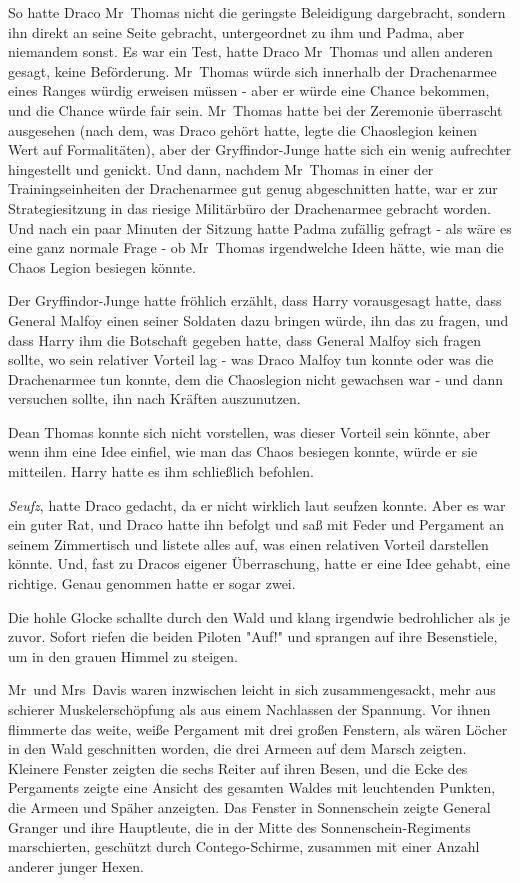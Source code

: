 {So hatte Draco Mr~Thomas nicht die geringste Beleidigung dargebracht, sondern ihn direkt an seine Seite gebracht, untergeordnet zu ihm und Padma, aber niemandem sonst. Es war ein Test, hatte Draco Mr~Thomas und allen anderen gesagt, keine Beförderung. Mr~Thomas würde sich innerhalb der Drachenarmee eines Ranges würdig erweisen müssen - aber er würde eine Chance bekommen, und die Chance würde fair sein. Mr~Thomas hatte bei der Zeremonie überrascht ausgesehen (nach dem, was Draco gehört hatte, legte die Chaoslegion keinen Wert auf Formalitäten), aber der Gryffindor-Junge hatte sich ein wenig aufrechter hingestellt und genickt. Und dann, nachdem Mr~Thomas in einer der Trainingseinheiten der Drachenarmee gut genug abgeschnitten hatte, war er zur Strategiesitzung in das riesige Militärbüro der Drachenarmee gebracht worden. Und nach ein paar Minuten der Sitzung hatte Padma zufällig gefragt - als wäre es eine ganz normale Frage - ob Mr~Thomas irgendwelche Ideen hätte, wie man die Chaos Legion besiegen könnte.

Der Gryffindor-Junge hatte fröhlich erzählt, dass Harry vorausgesagt hatte, dass General Malfoy einen seiner Soldaten dazu bringen würde, ihn das zu fragen, und dass Harry ihm die Botschaft gegeben hatte, dass General Malfoy sich fragen sollte, wo sein relativer Vorteil lag - was Draco Malfoy tun konnte oder was die Drachenarmee tun konnte, dem die Chaoslegion nicht gewachsen war - und dann versuchen sollte, ihn nach Kräften auszunutzen.

Dean Thomas konnte sich nicht vorstellen, was dieser Vorteil sein könnte, aber wenn ihm eine Idee einfiel, wie man das Chaos besiegen konnte, würde er sie mitteilen. Harry hatte es ihm schließlich befohlen.

\emph{Seufz}, hatte Draco gedacht, da er nicht wirklich laut seufzen konnte. Aber es war ein guter Rat, und Draco hatte ihn befolgt und saß mit Feder und Pergament an seinem Zimmertisch und listete alles auf, was einen relativen Vorteil darstellen könnte. Und, fast zu Dracos eigener Überraschung, hatte er eine Idee gehabt, eine richtige. Genau genommen hatte er sogar zwei.

Die hohle Glocke schallte durch den Wald und klang irgendwie bedrohlicher als je zuvor. Sofort riefen die beiden Piloten "Auf!" und sprangen auf ihre Besenstiele, um in den grauen Himmel zu steigen.

Mr~und Mrs~Davis waren inzwischen leicht in sich zusammengesackt, mehr aus schierer Muskelerschöpfung als aus einem Nachlassen der Spannung. Vor ihnen flimmerte das weite, weiße Pergament mit drei großen Fenstern, als wären Löcher in den Wald geschnitten worden, die drei Armeen auf dem Marsch zeigten. Kleinere Fenster zeigten die sechs Reiter auf ihren Besen, und die Ecke des Pergaments zeigte eine Ansicht des gesamten Waldes mit leuchtenden Punkten, die Armeen und Späher anzeigten. Das Fenster in Sonnenschein zeigte General Granger und ihre Hauptleute, die in der Mitte des Sonnenschein-Regiments marschierten, geschützt durch Contego-Schirme, zusammen mit einer Anzahl anderer junger Hexen.

}
